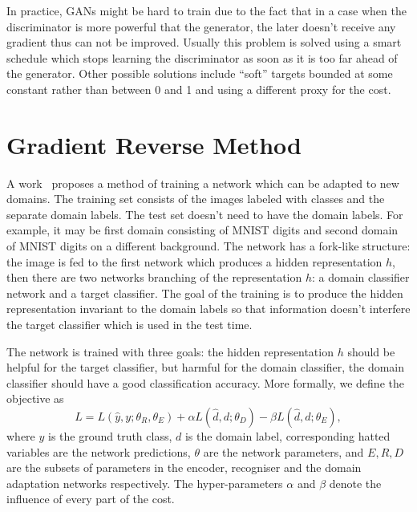\documentclass{article}
\begin{document}
    In practice, GANs might be hard to train due to the fact that in a case when 
    the discriminator is more powerful that the generator, the later doesn't 
    receive any gradient thus can not be improved. Usually this problem is solved
    using a smart schedule which stops learning the discriminator as soon as it
    is too far ahead of the generator. Other possible solutions include ``soft''
    targets bounded at some constant rather than between 0 and 1 and using a 
    different proxy for the cost.

\section{Gradient Reverse Method}
\label{sec:gradient-reverse}

    A work~\cite{ganin2014unsupervised} proposes a method of training a network 
    which can be adapted to new domains. The training set consists of the images
    labeled with classes and the separate domain labels. The test set doesn't need
    to have the domain labels. For example, it may be first domain
    consisting of MNIST digits and second domain of MNIST digits on a different
    background. The network has a fork-like structure: the image is fed to the
    first network which produces a hidden representation $h$, then there are two
    networks branching of the representation $h$: a domain classifier network and 
    a target classifier. The goal of the training is to produce the hidden 
    representation invariant to the domain labels so that information doesn't 
    interfere the target classifier which is used in the test time.

    The network is trained with three goals: the hidden representation $h$ should
    be helpful for the target classifier, but harmful for the domain classifier,
    the domain classifier should have a good classification accuracy. More 
    formally, we define the objective as
    \begin{equation}
        L = L(\hat{y}, y; \theta_R, \theta_E) + 
        \alpha L(\hat{d}, d; \theta_D) -
        \beta L(\hat{d}, d; \theta_E),
    \end{equation}
    where $y$ is the ground truth class, $d$ is the domain label, corresponding
    hatted variables are the network predictions, $\theta$ are the network 
    parameters, and $E, R, D$ are the subsets of parameters in the encoder,
    recogniser and the domain adaptation networks respectively. The hyper-parameters
    $\alpha$ and $\beta$ denote the influence of every part of the cost.
\end{document}
